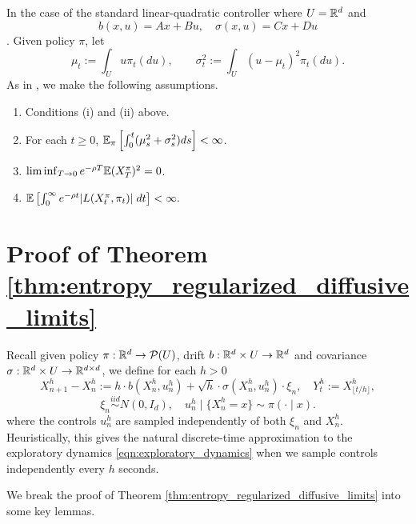 \noindent In the case of the standard linear-quadratic controller where $U = \mathbb{R}^d$ and
%
\[b(x,u) = Ax + Bu, \quad \sigma(x,u) = Cx + Du\]
%
\noindent {}. Given policy $\pi$, let
%
\[\mu_t := \int_U u \pi_t(du), \qquad \sigma_t^2 := \int_U (u - \mu_t)^2 \pi_t(du). \]
%
\noindent As in \cite{wang2020_reinforcement_learning_stochastic_control}, we make the following assumptions.

\begin{enumerate}[label=(\alph*)]
	\item Conditions (i) and (ii) above.
	\item For each $t \geq 0$, $\mathbb{E}_\pi \left[\int_0^t (\mu_s^2 + \sigma_s^2) ds\right] < \infty$.
	\item $\lim \inf_{T \to 0} e^{-\rho T} \mathbb{E} (X_T^\pi)^2 = 0$.
	\item $\mathbb{E} \left[\int_0^\infty e^{-\rho t} |L(X^\pi_t, \pi_t)| \; dt\right] < \infty.$
\end{enumerate}

\noindent


\section{Proof of Theorem \ref{thm:entropy_regularized_diffusive_limits}}

Recall given policy $\pi:\mathbb{R}^d \to \mathcal{P}(U)$, drift $b:\mathbb{R}^d \times U \to \mathbb{R}^d$ and covariance
 $\sigma:\mathbb{R}^d\times U \to \mathbb{R}^{d \times d}$, we define for each $h > 0$
	\[X^h_{n+1} - X^h_{n} := h \cdot b(X^h_{n}, u^h_n) + \sqrt{h} \cdot \sigma(X^h_{n} , u^h_n) \cdot \xi_n,  \quad Y^h_t := X^h_{\lfloor t/h \rfloor},\]
	\[\xi_n \overset{iid}{\sim} N(0, I_d), \quad u^h_n \mid \{X^h_n = x\} \sim \pi(\cdot \mid x).\]
 where the controls $u_n^h$ are sampled independently of both $\xi_n$ and $X_n^h$. Heuristically, this gives the natural
 discrete-time approximation to the exploratory dynamics \eqref{eqn:exploratory_dynamics} when we sample controls independently every $h$ seconds.

We break the proof of Theorem \ref{thm:entropy_regularized_diffusive_limits} into some key lemmas.


